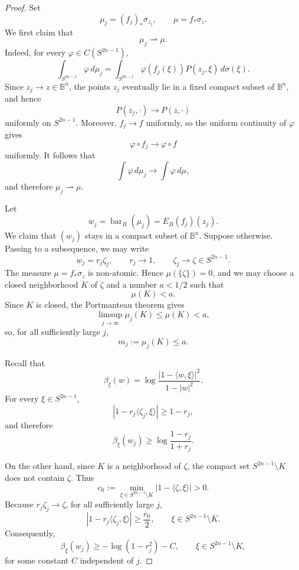 \documentclass[10pt,a4paper]{amsart}
\newcommand{\B}{\mathbb B}
\newcommand{\barB}{\operatorname{bar}_{B}}
\theoremstyle{plain}
\theoremstyle{definition}
\theoremstyle{remark}
\theoremstyle{definition}
\begin{document}
\begin{proof}
Set
\[
        \mu_j=(f_j)_*\sigma_{z_j},
        \qquad
        \mu=f_*\sigma_z.
\]
We first claim that
\[
        \mu_j\rightharpoonup\mu.
\]
Indeed, for every \(\varphi\in C(S^{2n-1})\),
\[
\int_{S^{2n-1}}\varphi\,d\mu_j
=
\int_{S^{2n-1}}
\varphi(f_j(\xi))P(z_j,\xi)\,d\sigma(\xi).
\]
Since \(z_j\to z\in\B^n\), the points \(z_j\) eventually lie in a fixed
compact subset of \(\B^n\), and hence
\[
        P(z_j,\cdot)\longrightarrow P(z,\cdot)
\]
uniformly on \(S^{2n-1}\). Moreover, \(f_j\to f\) uniformly, so the uniform
continuity of \(\varphi\) gives
\[
        \varphi\circ f_j\longrightarrow\varphi\circ f
\]
uniformly. It follows that
\[
        \int\varphi\,d\mu_j\longrightarrow\int\varphi\,d\mu,
\]
and therefore \(\mu_j\rightharpoonup\mu\).

Let
\[
        w_j=\barB(\mu_j)=E_B(f_j)(z_j).
\]
We claim that \((w_j)\) stays in a compact subset of \(\B^n\). Suppose
otherwise. Passing to a subsequence, we may write
\[
        w_j=r_j\zeta_j,
        \qquad
        r_j\to1,
        \qquad
        \zeta_j\to\zeta\in S^{2n-1}.
\]
The measure \(\mu=f_*\sigma_z\) is non-atomic. Hence
\(\mu(\{\zeta\})=0\), and we may choose a closed neighborhood \(K\) of
\(\zeta\) and a number \(a<1/2\) such that
\[
        \mu(K)<a.
\]
Since \(K\) is closed, the Portmanteau theorem gives
\[
        \limsup_{j\to\infty}\mu_j(K)\le \mu(K)<a,
\]
so, for all sufficiently large \(j\),
\[
        m_j:=\mu_j(K)\le a.
\]

Recall that
\[
        \beta_\xi(w)
        =
        \log\frac{|1-\langle w,\xi\rangle|^2}{1-|w|^2}.
\]
For every \(\xi\in S^{2n-1}\),
\[
        |1-r_j\langle\zeta_j,\xi\rangle|
        \ge 1-r_j,
\]
and therefore
\begin{equation}\label{eq:busemann-global-lower}
        \beta_\xi(w_j)
        \ge
        \log\frac{1-r_j}{1+r_j}.
\end{equation}

On the other hand, since \(K\) is a neighborhood of \(\zeta\), the compact
set \(S^{2n-1}\setminus K\) does not contain \(\zeta\). Thus
\[
        c_0:=
        \min_{\xi\in S^{2n-1}\setminus K}
        |1-\langle\zeta,\xi\rangle|>0.
\]
Because \(r_j\zeta_j\to\zeta\), for all sufficiently large \(j\),
\[
        |1-r_j\langle\zeta_j,\xi\rangle|
        \ge \frac{c_0}{2},
        \qquad
        \xi\in S^{2n-1}\setminus K.
\]
Consequently,
\begin{equation}\label{eq:busemann-away-lower}
        \beta_\xi(w_j)
        \ge
        -\log(1-r_j^2)-C,
        \qquad
        \xi\in S^{2n-1}\setminus K,
\end{equation}
for some constant \(C\) independent of \(j\).


\end{proof}
\end{document}
